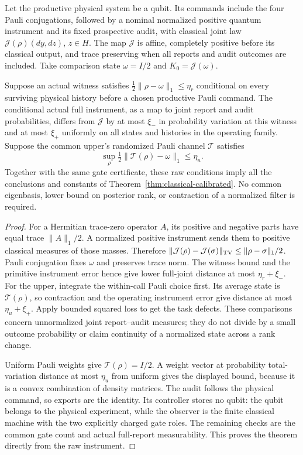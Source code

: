 \begin{theorem}\label{thm:quantum-calibrated}
Let the productive physical system be a qubit. Its commands include the four Pauli conjugations, followed by a nominal normalized positive quantum instrument and its fixed prospective audit, with classical joint law $\mathcal J(\rho)(dy,dz)$, $z\in H$. The map $\mathcal J$ is affine, completely positive before its classical output, and trace preserving when all reports and audit outcomes are included. Take comparison state $\omega=I/2$ and $K_0=\mathcal J(\omega)$.

Suppose an actual witness satisfies
$\frac12\|\rho-\omega\|_1\le\eta_r$ conditional on every surviving physical history before a chosen productive Pauli command. The conditional actual full instrument, as a map to joint report and audit probabilities, differs from $\mathcal J$ by at most $\xi_-$ in probability variation at this witness and at most $\xi_+$ uniformly on all states and histories in the operating family. Suppose the common upper's randomized Pauli channel $\mathcal T$ satisfies
\[
 \sup_{\rho}\tfrac12\|\mathcal T(\rho)-\omega\|_1\le\eta_u.
\]
Together with the same gate certificate, these raw conditions imply all the conclusions and constants of Theorem~\ref{thm:classical-calibrated}. No common eigenbasis, lower bound on posterior rank, or contraction of a normalized filter is required.
\end{theorem}
\begin{proof}
For a Hermitian trace-zero operator $A$, its positive and negative parts have equal trace $\|A\|_1/2$. A normalized positive instrument sends them to positive classical measures of those masses. Therefore
$\|\mathcal J(\rho)-\mathcal J(\sigma)\|_{\mathrm{TV}}\le\|\rho-\sigma\|_1/2$.
Pauli conjugation fixes $\omega$ and preserves trace norm. The witness bound and the primitive instrument error hence give lower full-joint distance at most $\eta_r+\xi_-$. For the upper, integrate the within-call Pauli choice first. Its average state is $\mathcal T(\rho)$, so contraction and the operating instrument error give distance at most $\eta_u+\xi_+$. Apply bounded squared loss to get the task defects. These comparisons concern unnormalized joint report--audit measures; they do not divide by a small outcome probability or claim continuity of a normalized state across a rank change.

Uniform Pauli weights give $\mathcal T(\rho)=I/2$. A weight vector at probability total-variation distance at most $\eta_u$ from uniform gives the displayed bound, because it is a convex combination of density matrices. The audit follows the physical command, so exports are the identity. Its controller stores no qubit: the qubit belongs to the physical experiment, while the observer is the finite classical machine with the two explicitly charged gate roles. The remaining checks are the common gate count and actual full-report measurability. This proves the theorem directly from the raw instrument.
\end{proof}


